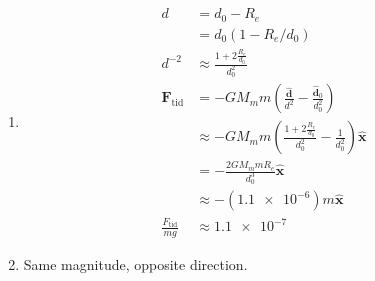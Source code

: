 \documentclass{article}
\renewcommand{\vec}[1]{\boldsymbol{\mathbf{#1}}}
\newcommand{\uvec}[1]{\hat{\vec{#1}}}
\begin{document}
\setcounter{subsection}{2}
\subsection{}

\begin{enumerate}
  \item

        \begin{align*}
          d                        & = d_0 - R_e                                                                                    \\
                                   & = d_0 (1 - R_e / d_0)                                                                          \\
          d^{-2}                   & \approx \frac{1 + 2 \frac{R_e}{d_0}}{d_0^2}                                                    \\
          \vec{F}_\text{tid}       & = -G M_m m \left( \frac{\uvec{d}}{d^2} - \frac{\uvec{d}_0}{d_0^2} \right)                      \\
                                   & \approx -G M_m m \left( \frac{1 + 2 \frac{R_e}{d_0}}{d_0^2} - \frac{1}{d_0^2} \right) \uvec{x} \\
                                   & = -\frac{2 G M_m m R_e}{d_0^3} \uvec{x}                                                        \\
                                   & \approx -(\num{1.1e-6}) m \uvec{x}                                                             \\
          \frac{F_\text{tid}}{m g} & \approx \num{1.1e-7}
        \end{align*}

  \item Same magnitude, opposite direction.
\end{enumerate}
\end{document}
